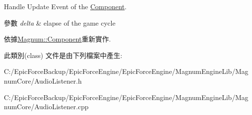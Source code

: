Handle Update Event of the \hyperlink{class_magnum_1_1_component}{Component}. 


\begin{DoxyParams}{參數}
{\em delta} & elapse of the game cycle \\
\hline
\end{DoxyParams}


依據\hyperlink{class_magnum_1_1_component}{Magnum\+::\+Component}重新實作.



此類別(class) 文件是由下列檔案中產生\+:\begin{DoxyCompactItemize}
\item 
C\+:/\+Epic\+Force\+Backup/\+Epic\+Force\+Engine/\+Epic\+Force\+Engine/\+Magnum\+Engine\+Lib/\+Magnum\+Core/Audio\+Listener.\+h\item 
C\+:/\+Epic\+Force\+Backup/\+Epic\+Force\+Engine/\+Epic\+Force\+Engine/\+Magnum\+Engine\+Lib/\+Magnum\+Core/Audio\+Listener.\+cpp\end{DoxyCompactItemize}
